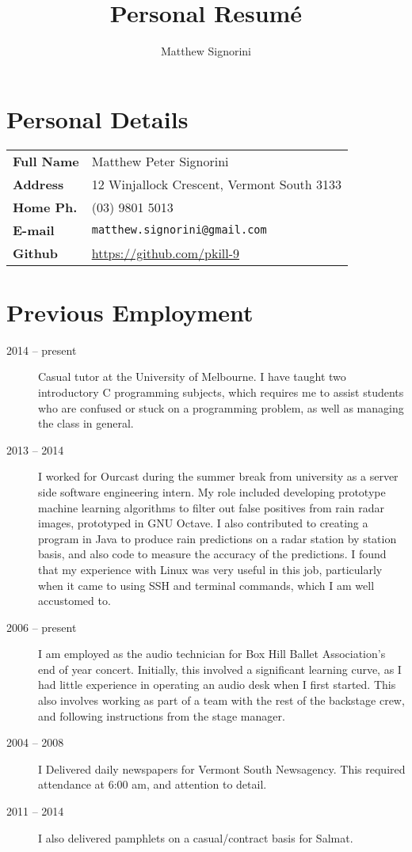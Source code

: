 \documentclass[a4paper]{article}
\title{Personal Resum\'e}
\author{Matthew Signorini}
\begin{document}
\maketitle

\section{Personal Details}
\begin{tabular}{>{\raggedright}m{3cm} l}
    \textbf{Full Name} &Matthew Peter Signorini\\
 \textbf{Address} &12 Winjallock Crescent, Vermont South 3133\\
\textbf{Home Ph.} &(03) 9801 5013\\
    \textbf{E-mail} &\texttt{matthew.signorini@gmail.com}\\
    \textbf{Github} &\url{https://github.com/pkill-9}
\end{tabular}


\section{Previous Employment}
\begin{description}
    \item[2014 -- present] Casual tutor at the University of Melbourne. I
        have taught two introductory C programming subjects, which requires
        me to assist students who are confused or stuck on a programming
        problem, as well as managing the class in general.
    \item[2013 -- 2014] I worked for Ourcast during the summer break from
        university as a server side software engineering intern. My role
        included developing prototype machine learning algorithms to filter
        out false positives from rain radar images, prototyped in GNU 
        Octave. I also contributed to creating a program in Java to produce
        rain predictions on a radar station by station basis, and also code
        to measure the accuracy of the predictions. I found that my
        experience with Linux was very useful in this job, particularly when
        it came to using SSH and terminal commands, which I am well accustomed
        to.
    \item[2006 -- present] I am employed as the audio technician for Box
        Hill Ballet Association's end of year concert. Initially, this 
        involved a significant learning curve, as I had little experience 
        in operating an audio desk when I first started. This also involves 
        working as part of a team with the rest of the backstage crew, and
        following instructions from the stage manager.
    \item[2004 -- 2008] I Delivered daily newspapers for Vermont South
        Newsagency. This required attendance at 6:00 am, and attention to
        detail.
    \item[2011 -- 2014] I also delivered pamphlets on a casual/contract
        basis for Salmat.
\end{description}
\end{document}
